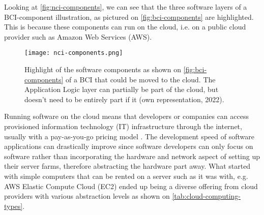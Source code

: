 Looking at \autoref{fig:nci-components}, we can see that the three software layers of a BCI-component illustration, as pictured on \autoref{fig:bci-components} are highlighted. This is because these components can run on the cloud, i.e. on a public cloud provider such as Amazon Web Services (AWS).

\begin{figure}[!ht]
  \centering
  \texttt{[image: nci-components.png]}
  \caption{Highlight of the software components as shown on \autoref{fig:bci-components} of a BCI that could be moved to the cloud. The Application Logic layer can partially be part of the cloud, but doesn't need to be entirely part if it (own representation, 2022).}
  \label{fig:nci-components}
\end{figure}

Running software on the cloud means that developers or companies can access provisioned information technology (IT) infrastructure through the internet, usually with a pay-as-you-go pricing model \citep{amazon_web_services_inc_what_nodate}. The development speed of software applications can drastically improve since software developers can only focus on software rather than incorporating the hardware and network aspect of setting up their server farms, therefore abstracting the hardware part away. What started with simple computers that can be rented on a server such as it was with, e.g. AWS Elastic Compute Cloud (EC2) \citep{barr_amazon_2006} ended up being a diverse offering from cloud providers with various abstraction levels as shown on \autoref{tab:cloud-computing-types}.

